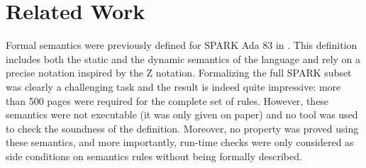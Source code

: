\section{Related Work}
Formal semantics were previously defined for SPARK Ada 83 in \cite{Marsh:Book94,Neil:Book94}. 
This definition includes both the static and the dynamic semantics of 
the language and rely on a precise notation inspired by the Z notation. 
Formalizing the full SPARK subset was clearly a challenging task and 
the result is indeed quite impressive: more than 500 pages were 
required for the complete set of rules. However, these semantics 
were not executable (it was only given on paper) and no tool was used 
to check the soundness of the definition. Moreover, no property was 
proved using these semantics, and more importantly, run-time checks 
were only considered as side conditions on semantics rules without 
being formally described.